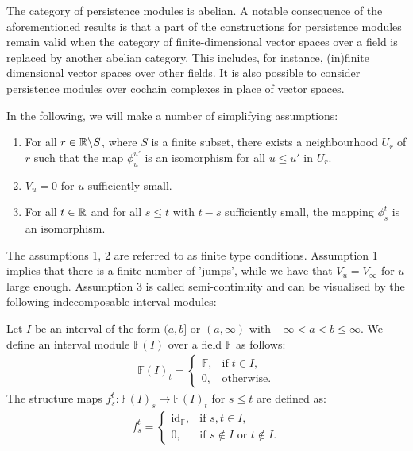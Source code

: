 The category of persistence modules is abelian. A notable consequence of the aforementioned results is that a part of the constructions for persistence modules remain valid when the category of finite-dimensional vector spaces over a field is replaced by another abelian category. This includes, for instance, (in)finite dimensional vector spaces over other fields. It is also possible to consider persistence modules over cochain complexes in place of vector spaces.

In the following, we will make a number of simplifying assumptions:

\begin{assume}\noindent
\begin{enumerate}
	\item For all $r \in {\mathbb{R}}\backslash S$, where $S$ is a finite subset, there exists a neighbourhood $U_r$ of $r$ such that the map $\phi_u^{u'}$ is an isomorphism for all $u \leq u'$ in $U_r$.
	\item $V_u = 0$ for $u$ sufficiently small.
	\item For all $t \in {\mathbb{R}}$ and for all $s \leq t$ with $t-s$ sufficiently small, the mapping $\phi_s^t$ is an isomorphism.
\end{enumerate}
\end{assume}

The assumptions 1, 2 are referred to as finite type conditions. Assumption 1 implies that there is a finite number of 'jumps', while we have that $V_u = V_\infty$ for $u$ large enough. Assumption 3 is called semi-continuity and can be visualised by the following indecomposable interval modules:

\begin{definition}
Let $I$ be an interval of the form $(a,b]$ or $(a,\infty)$ with $-\infty < a < b \leq \infty$. We define an interval module $\mathbb{F}(I)$ over a field $\mathbb{F}$ as follows:
\begin{align}
	\mathbb{F}(I)_t = 
	\begin{cases}
		\mathbb{F}, & \text{if} \; t \in I, \\
		0, & \text{otherwise}.
	\end{cases}
\end{align}
The structure maps $f_{s}^t: \mathbb{F}(I)_s \to \mathbb{F}(I)_t$ for $s \leq t$ are defined as:
\begin{align}
	f_{s}^t = 
	\begin{cases}
		\mathrm{id}_{\mathbb{F}}, & \text{if } s, t \in I, \\
		0, & \text{if } s \notin I \text{ or } t \notin I.
	\end{cases}
\end{align}
\end{definition}

